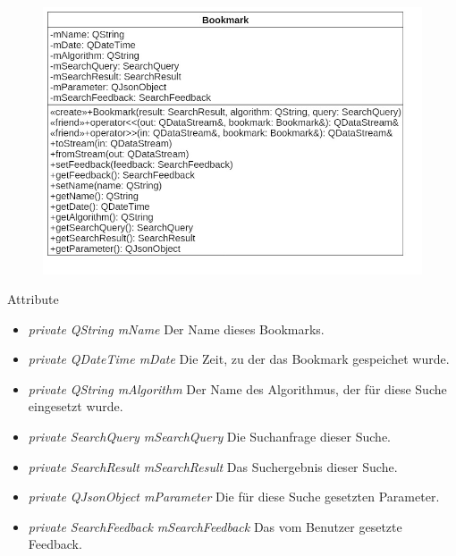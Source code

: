 \begin{figure}[H]
\centering
\includegraphics[scale=0.5]{img/Klassendiagramm/Klassen/Bookmark}
\label{fig:bookmark}
\end{figure}

Attribute
\begin{itemize}
\item\textit{private QString mName} Der Name dieses Bookmarks.
\item\textit{private QDateTime mDate} Die Zeit, zu der das Bookmark gespeichet wurde.
\item\textit{private QString mAlgorithm} Der Name des Algorithmus, der für diese Suche eingesetzt wurde.
\item\textit{private SearchQuery mSearchQuery} Die Suchanfrage dieser Suche.
\item\textit{private SearchResult mSearchResult} Das Suchergebnis dieser Suche.
\item\textit{private QJsonObject mParameter} Die für diese Suche gesetzten Parameter.
\item\textit{private SearchFeedback mSearchFeedback} Das vom Benutzer gesetzte Feedback.
\end{itemize}


